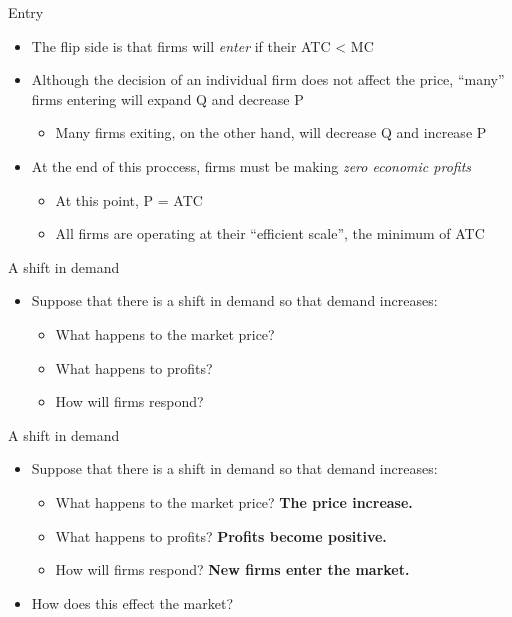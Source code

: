\documentclass[aspectratio=169]{beamer}
\begin{document}
\begin{frame}{Entry}
    \begin{itemize}
        \item The flip side is that firms will \textit{enter} if their ATC < MC
        \item Although the decision of an individual firm does not affect the price, ``many'' firms entering will expand Q and decrease P
            \begin{itemize}
                \item Many firms exiting, on the other hand, will decrease Q and increase P
            \end{itemize}
        \item At the end of this proccess, firms must be making \textit{zero economic profits}
            \begin{itemize}
                \item At this point, P = ATC
                \item All firms are operating at their ``efficient scale'', the minimum of ATC
            \end{itemize}
    \end{itemize}
\end{frame}

\begin{frame}{A shift in demand}
    \begin{itemize}
        \item Suppose that there is a shift in demand so that demand increases:
            \begin{itemize}
                \item What happens to the market price?
                \item What happens to profits?
                \item How will firms respond?
            \end{itemize}
    \end{itemize}
\end{frame}

\begin{frame}{A shift in demand}
    \begin{itemize}
        \item Suppose that there is a shift in demand so that demand increases:
            \begin{itemize}
                \item What happens to the market price? \textbf{The price increase.}
                \item What happens to profits? \textbf{Profits become positive.}
                \item How will firms respond? \textbf{New firms enter the market.}
            \end{itemize}
        \item How does this effect the market?
    \end{itemize}
\end{frame}
\end{document}
